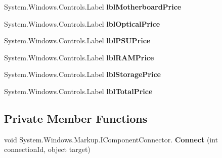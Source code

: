 \begin{DoxyCompactItemize}
\item 
System.\+Windows.\+Controls.\+Label {\bfseries lbl\+Motherboard\+Price}\hypertarget{class_p_c_builder_forms_1_1_build_results_af60eb9523153380fa10597706607b2cd}{}\label{class_p_c_builder_forms_1_1_build_results_af60eb9523153380fa10597706607b2cd}

\item 
System.\+Windows.\+Controls.\+Label {\bfseries lbl\+Optical\+Price}\hypertarget{class_p_c_builder_forms_1_1_build_results_ac4064daf48187fd8db6b9b6edf71a59a}{}\label{class_p_c_builder_forms_1_1_build_results_ac4064daf48187fd8db6b9b6edf71a59a}

\item 
System.\+Windows.\+Controls.\+Label {\bfseries lbl\+P\+S\+U\+Price}\hypertarget{class_p_c_builder_forms_1_1_build_results_af725e7c751a522182b6c906ad340b025}{}\label{class_p_c_builder_forms_1_1_build_results_af725e7c751a522182b6c906ad340b025}

\item 
System.\+Windows.\+Controls.\+Label {\bfseries lbl\+R\+A\+M\+Price}\hypertarget{class_p_c_builder_forms_1_1_build_results_adc5adb7b6e219ff35fbdc944607c695b}{}\label{class_p_c_builder_forms_1_1_build_results_adc5adb7b6e219ff35fbdc944607c695b}

\item 
System.\+Windows.\+Controls.\+Label {\bfseries lbl\+Storage\+Price}\hypertarget{class_p_c_builder_forms_1_1_build_results_a26ae7c8a56885b91872ee41e86829b12}{}\label{class_p_c_builder_forms_1_1_build_results_a26ae7c8a56885b91872ee41e86829b12}

\item 
System.\+Windows.\+Controls.\+Label {\bfseries lbl\+Total\+Price}\hypertarget{class_p_c_builder_forms_1_1_build_results_a357080103fc5b8fcadb2929339225e37}{}\label{class_p_c_builder_forms_1_1_build_results_a357080103fc5b8fcadb2929339225e37}

\end{DoxyCompactItemize}
\subsection*{Private Member Functions}
\begin{DoxyCompactItemize}
\item 
void System.\+Windows.\+Markup.\+I\+Component\+Connector. {\bfseries Connect} (int connection\+Id, object target)\hypertarget{class_p_c_builder_forms_1_1_build_results_a6fa0ebd3e7f1d83778bdf6176cd88013}{}\label{class_p_c_builder_forms_1_1_build_results_a6fa0ebd3e7f1d83778bdf6176cd88013}

\end{DoxyCompactItemize}
